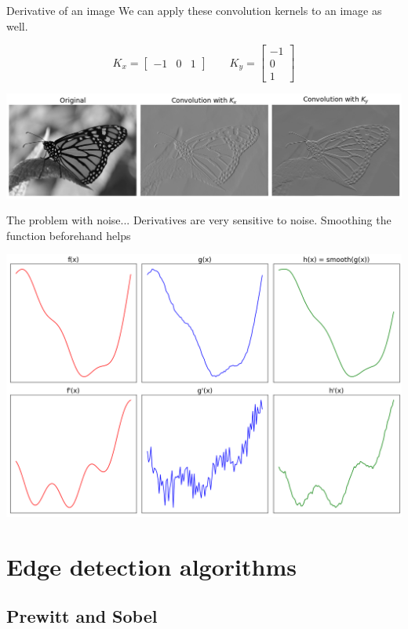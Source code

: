 \documentclass[9pt, aspectratio=169]{beamer}
\begin{document}
\begin{frame}
    {Derivative of an image}
    We can apply these convolution kernels to an image as well.

    $$K_x = \begin{bmatrix}-1&0&1\end{bmatrix} \qquad K_y = \begin{bmatrix}-1\\0\\1\end{bmatrix}$$

    \centering
    \includegraphics[width=.8\textwidth]{monarch_derivatives.png}
\end{frame}

\begin{frame}
    {The problem with noise...}
    Derivatives are very sensitive to noise. Smoothing the function beforehand helps

    \centering
    \includegraphics[width=.7\textwidth]{derivative_noise.png}
\end{frame}

\section{Edge detection algorithms}
\subsection{Prewitt and Sobel}
\end{document}

